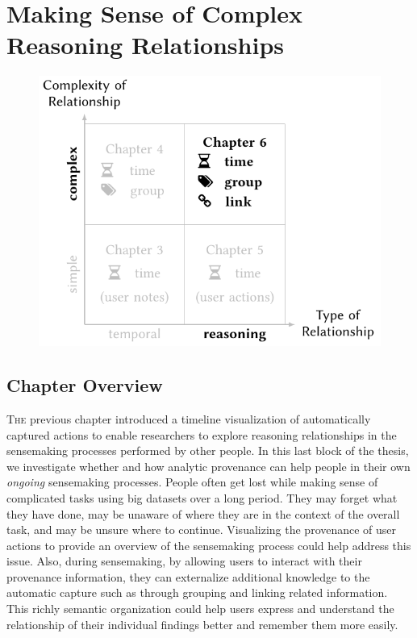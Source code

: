 \chapter{Making Sense of Complex Reasoning Relationships}
\label{chap:sensemap}

\graphicspath{{Chapter6/figures/}}

\begin{figure}[!h]
	\centering
	\includegraphics{work}
\end{figure}

\pagebreak

\section{Chapter Overview}
\lettrine{T}{he} previous chapter introduced a timeline visualization of automatically captured actions to enable researchers to explore reasoning relationships in the sensemaking processes performed by other people. In this last block of the thesis, we investigate whether and how analytic provenance can help people in their own \emph{ongoing} sensemaking processes. People often get lost while making sense of complicated tasks using big datasets over a long period. They may forget what they have done, may be unaware of where they are in the context of the overall task, and may be unsure where to continue. Visualizing the provenance of user actions to provide an overview of the sensemaking process could help address this issue. Also, during sensemaking, by allowing users to interact with their provenance information, they can externalize additional knowledge to the automatic capture such as through grouping and linking related information. This richly semantic organization could help users express and understand the relationship of their individual findings better and remember them more easily.

